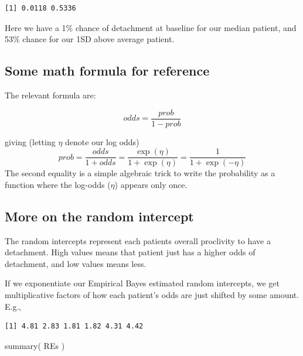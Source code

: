 \documentclass[
  letterpaper,
  DIV=11,
  numbers=noendperiod]{scrreprt}
\newenvironment{Shaded}{}{}
\newcommand{\AttributeTok}[1]{\textcolor[rgb]{0.49,0.56,0.16}{#1}}
\newcommand{\FunctionTok}[1]{\textcolor[rgb]{0.02,0.16,0.49}{#1}}
\newcommand{\NormalTok}[1]{#1}
\newcommand{\OtherTok}[1]{\textcolor[rgb]{0.00,0.44,0.13}{#1}}
\newcommand{\SpecialCharTok}[1]{\textcolor[rgb]{0.25,0.44,0.63}{#1}}
\newcommand{\StringTok}[1]{\textcolor[rgb]{0.25,0.44,0.63}{#1}}
\begin{document}
\begin{verbatim}
[1] 0.0118 0.5336
\end{verbatim}

Here we have a 1\% chance of detachment at baseline for our median
patient, and 53\% chance for our 1SD above average patient.

\subsection{Some math formula for
reference}\label{some-math-formula-for-reference}

The relevant formula are:

\[
odds = \frac{ prob }{1 - prob}
\]

giving (letting \(\eta\) denote our log odds) \[
prob = \frac{ odds }{ 1 + odds } = \frac{ \exp( \eta ) }{ 1 + \exp(\eta)} = \frac{1}{1 + \exp(-\eta) }
\] The second equality is a simple algebraic trick to write the
probability as a function where the log-odds (\(\eta\)) appears only
once.

\subsection{More on the random
intercept}\label{more-on-the-random-intercept}

The random intercepts represent each patients overall proclivity to have
a detachment. High values means that patient just has a higher odds of
detachment, and low values means less.

If we exponentiate our Empirical Bayes estimated random intercepts, we
get multiplicative factors of how each patient's odds are just shifted
by some amount. E.g.,

\begin{Shaded}
\end{Shaded}

\begin{verbatim}
[1] 4.81 2.83 1.81 1.82 4.31 4.42
\end{verbatim}

\begin{Shaded}
\begin{Highlighting}[]
\FunctionTok{summary}\NormalTok{( REs )}
\end{Highlighting}
\end{Shaded}
\end{document}
